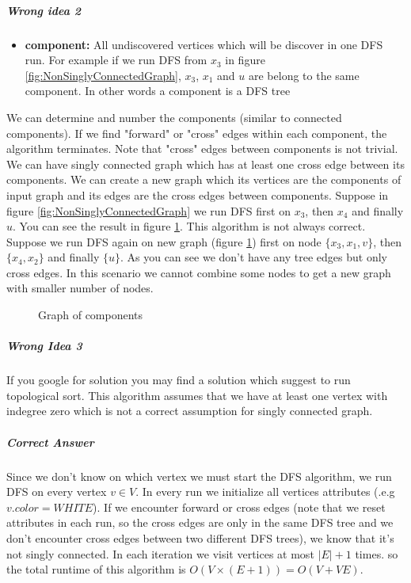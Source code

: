 \documentclass{book}
\begin{document}
	\subparagraph{Wrong idea 2}
	\begin{itemize}
		\item[] \textbf{component:} All undiscovered vertices which will be discover in one DFS run. For example if we run DFS from $x_3$ in figure \ref{fig:NonSinglyConnectedGraph}, $x_3$, $x_1$ and $u$ are belong to the same component. In other words a component is a DFS tree
	\end{itemize}
	We can determine and number the components (similar to connected components). If we find "forward" or "cross" edges within each component, the algorithm terminates. Note that "cross" edges between components is not trivial. We can have singly connected graph which has at least one cross edge between its components. We can create a new graph which its vertices are the components of input graph and its edges are the cross edges between components. Suppose in figure \ref{fig:NonSinglyConnectedGraph} we run DFS first on $x_3$, then $x_4$ and finally $u$. You can see the result in figure \ref{fig:GraphOfComponents}. This algorithm is not always correct. Suppose we run DFS again on new graph (figure \ref{fig:GraphOfComponents}) first on node $\{x_3, x_1, v\}$, then $\{x_4, x_2\}$ and finally $\{u\}$. As you can see we don't have any tree edges but only cross edges. In this scenario we cannot combine some nodes to get a new graph with smaller number of nodes.
	\begin{figure}[h!]
		\centering
		\caption{Graph of components}
		\label{fig:GraphOfComponents}
	\end{figure}
	\subparagraph{Wrong Idea 3}
	If you google for solution you may find a solution which suggest to run topological sort. This algorithm assumes that we have at least one vertex with indegree zero which is not a correct assumption for singly connected graph.
	\subparagraph{Correct Answer}
	Since we don't know on which vertex we must start the DFS algorithm, we run DFS on every vertex $v \in V$. In every run we initialize all vertices attributes (.e.g $v.color = WHITE$). If we encounter forward or cross edges (note that we reset attributes in each run, so the cross edges are only in the same DFS tree and we don't encounter cross edges between two different DFS trees), we know that it's not singly connected. In each iteration we visit vertices at most $|E| + 1$ times. so the total runtime of this algorithm is $O(V \times (E + 1)) = O(V + VE)$.
	
\end{document}
